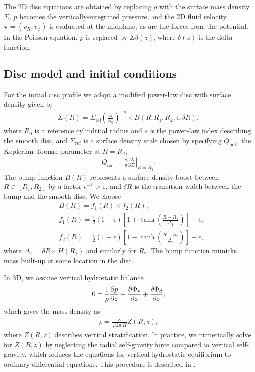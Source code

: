 
The 2D disc equations are obtained by replacing $\rho$ with the surface
mass density $\Sigma$, $p$ becomes the vertically-integrated pressure, 
and the 2D fluid
velocity $\bm{v}=(v_R,v_\phi)$ is evaluated at the midplane, as are
the forces from the potential. In the Poisson equation, $\rho$ is
replaced by $\Sigma\delta(z)$, where $\delta(z)$ is the
delta function. 

\subsection{Disc model and initial conditions}
For the initial disc profile we adopt a modified power-law disc with
surface density given by
\begin{align}
  \Sigma(R) = \Sigma_\mathrm{ref} \left(\frac{R}{R_0}\right)^{-s}\times B(R;
  R_{1}, R_{2}, \epsilon, \delta R), 
\end{align}
where $R_0$ is a reference cylindrical radius and $s$ is the power-law
index describing the smooth disc, and $\Sigma_\mathrm{ref}$ is a
surface density scale chosen by specifying $Q_\mathrm{out}$,
the Keplerian Toomre parameter at $R=R_{2}$,
\begin{align}
  Q_\mathrm{out} = \left.\frac{c_s\Omega_k}{\pi G
    \Sigma}\right|_{R=R_{2}}. 
\end{align}
The bump function
$B(R)$ represents a surface density boost between
$R\in[R_{1},R_{2}]$ by a factor $\epsilon^{-1}>1$,
and $\delta R$ is the transition width between the bump and the
smooth disc. We choose 
\begin{align}
  &B(R) = f_1(R)\times f_2(R),\\
  &f_1(R) = \frac{1}{2}\left(1 - \epsilon\right)\left[1 +
    \tanh\left(\frac{R-R_{1}}{\Delta_1}\right)\right]  + \epsilon,\\
  &f_2(R) = \frac{1}{2}\left(1 - \epsilon\right)\left[1 -
    \tanh\left(\frac{R-R_{2}}{\Delta_2}\right)\right]  + \epsilon,
\end{align}
where $\Delta_1 = \delta R \times H(R_{1})$ and similarly for
$R_{2}$. The bump function mimicks mass built-up at some location in 
the disc. 

In 3D, we assume vertical hydrostatic balance
\begin{align}
  0 = \frac{1}{\rho}\frac{\partial p}{\partial z} + \frac{\partial\Phi_*}{\partial z} + \frac{\partial
    \Phi_d}{\partial z},  
\end{align}
which gives the mass density as 
\begin{align}
  \rho = \frac{\Sigma}{\sqrt{2\pi}H}Z(R,z),
\end{align}
where $Z(R,z)$ describes vertical stratification. In practice, we
numerically solve for $Z(R,z)$ by neglecting the radial self-gravity
force compared to vertical self-gravity, which reduces the equations
for vertical hydrostatic equilibrium to ordinary differential
equations. This procedure is described in \cite{lin12b}. 

